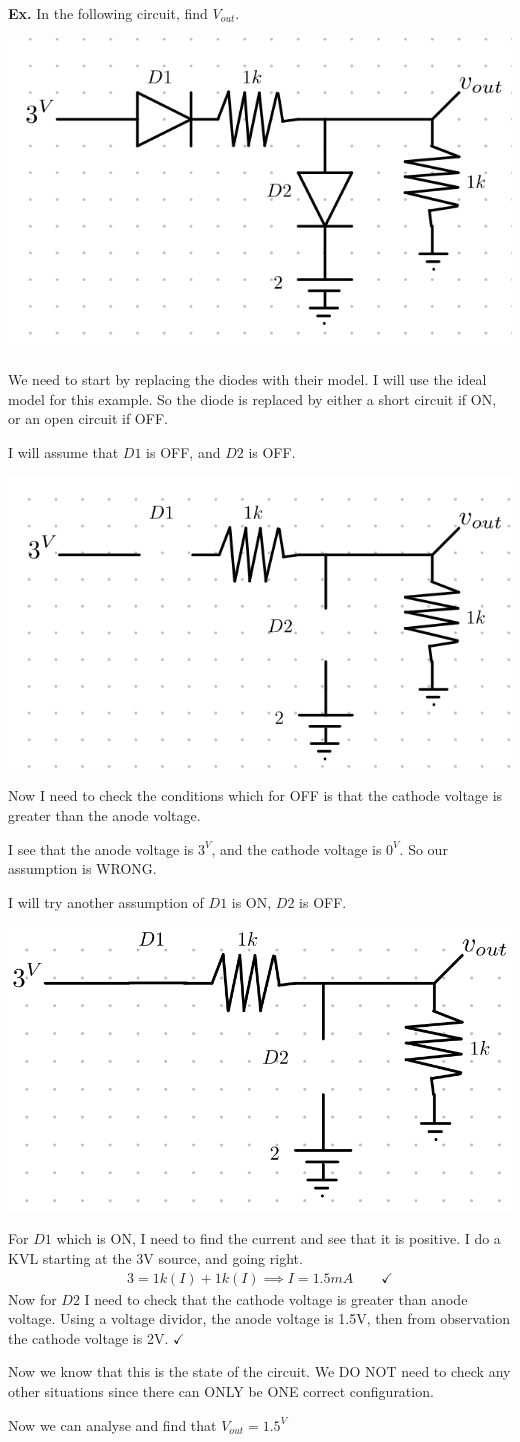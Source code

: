 \documentclass[12pt,letterpaper]{article} \usepackage{amsmath} \usepackage{graphicx} \usepackage[margin=1in]{geometry} \usepackage{longtable}  \usepackage{amssymb}
\begin{document}
	\begin{mdframed}[]
		\textbf{Ex. }In the following circuit, find $V_{out}$.
		\begin{center}
			\includegraphics[width=0.4\linewidth]{diodes-ex}
		\end{center}
		We need to start by replacing the diodes with their model. I will use the ideal model for this example. So the diode is replaced by either a short circuit if ON, or an open circuit if OFF. 
		
		I will assume that $D1$ is OFF, and $D2$ is OFF. 
		\begin{center}
			\includegraphics[width=0.4\linewidth]{diodes-ex1.1}
		\end{center}
		Now I need to check the conditions which for OFF is that the cathode voltage is greater than the anode voltage. 
		
		I see that the anode voltage is $3^V$, and the cathode voltage is $0^V$. So our assumption is WRONG.
		
		I will try another assumption of $D1$ is ON, $D2$ is OFF.
		\begin{center}
			\includegraphics[width=0.4\linewidth]{diodes-ex1.2}
		\end{center}
		For $D1$ which is ON, I need to find the current and see that it is positive. I do a KVL starting at the 3V source, and going right. 
		\begin{align*}
			3 = 1k(I)+1k(I) \implies I=1.5mA \qquad \checkmark
		\end{align*}
		Now for $D2$ I need to check that the cathode voltage is greater than anode voltage. Using a voltage dividor, the anode voltage is 1.5V, then from observation the cathode voltage is 2V. $\checkmark$
		
		Now we know that this is the state of the circuit. We DO NOT need to check any other situations since there can ONLY be ONE correct configuration. 
		
		Now we can analyse and find that $V_{out} = 1.5^V$
		
	\end{mdframed}
\end{document}
